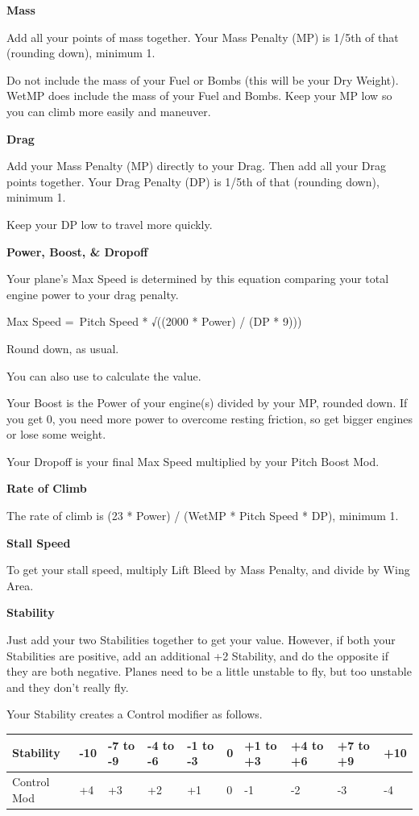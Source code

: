 \documentclass{article}
\begin{document}
\textbf{Mass}

Add all your points of mass together. Your Mass Penalty (MP) is
1/5th of that (rounding down), minimum 1.

Do not include the mass of your Fuel or Bombs (this will be your
Dry Weight). WetMP does include the mass of your Fuel and Bombs.
Keep your MP low so you can climb more easily and maneuver.

\textbf{Drag}

Add your Mass Penalty (MP) directly to your Drag. Then add all
your Drag points together. Your Drag Penalty (DP) is 1/5th of that
(rounding down), minimum 1.

Keep your DP low to travel more quickly.

\textbf{Power, Boost, \& Dropoff}

Your plane's Max Speed is determined by this equation comparing
your total engine power to your drag penalty.

Max Speed =~Pitch Speed * √((2000 * Power) / (DP * 9)))

Round down, as usual.

You can also use to calculate the value.

Your Boost is the Power of your engine(s) divided by your MP,
rounded down. If you get 0, you need more power to overcome resting
friction, so get bigger engines or lose some weight.

Your Dropoff is your final Max Speed multiplied by your Pitch
Boost Mod.

\textbf{Rate of Climb}

The rate of climb is (23 * Power) / (WetMP * Pitch Speed * DP),
minimum 1.

\textbf{Stall Speed}

To get your stall speed, multiply Lift Bleed by Mass Penalty, and
divide by Wing Area.

\textbf{Stability}

Just add your two Stabilities together to get your value.
However, if both your Stabilities are positive, add an additional +2
Stability, and do the opposite if they are both negative. Planes need to
be a little unstable to fly, but too unstable and they don't really
fly.

Your Stability creates a Control modifier as follows.

\begin{tabular}{|l|l|l|l|l|l|l|l|l|l|}
    \hline
    Stability   & -10      & -7 to -9 & -4 to -6 & -1 to -3 & 0 & +1 to +3 & +4 to
    +6          & +7 to +9 & +10                                                             \\\hline
    Control Mod & +4       & +3       & +2       & +1       & 0 & -1       & -2    & -3 & -4 \\\hline
\end{tabular}
\end{document}
